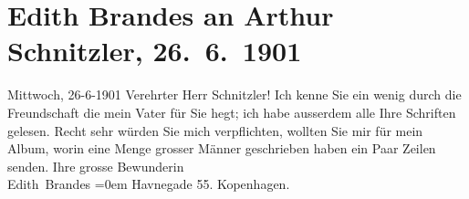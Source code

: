 

         
         \renewcommand{\erwaehntePersonen}{Personen: Georg Brandes}
         \renewcommand{\erwaehnteOrte}{Orte: Havnegade, Kopenhagen, Wien}
         \renewcommand{\erwaehnteWerke}{}
               \section[Edith Brandes an Arthur Schnitzler, 26. 6. 1901]{ Edith Brandes an Arthur Schnitzler, 26. 6. 1901}\nopagebreak{}\rehead{ }\begin{ledgroupsized}[t]{13cm}\normalsize\beginnumbering \toendnotes[C]{\smallbreak\pagebreak[2]} 
\toendnotes[C]{\smallbreak}\pstart
           \raggedleft{}{\pb}Mittwoch, 26-6-1901\pend
           \pstart{}Verehrter Herr Schnitzler!\pend\pstart
           Ich kenne Sie ein wenig durch die Freundschaft die mein Vater für Sie hegt; ich habe
                    ausserdem alle Ihre Schriften gelesen. Recht sehr würden Sie mich verpflichten,
                    wollten Sie mir für mein Album, worin eine Menge grosser Männer geschrieben
                    haben ein Paar Zeilen senden.\pend
           \pstart
           Ihre grosse Bewunderin{\\[\baselineskip]}\spacefill\mbox{Edith Brandes}\pend
           \leftskip=0em{}\pstart
           \noindent{}Havnegade 55. Kopenhagen.\pend
           
         
         \endnumbering{}\end{ledgroupsized}  \newcommand{\dateiname}{L01135}\newcommand{\titel}{Edith Brandes an Arthur Schnitzler, 26. 6. 1901}\newcommand{\editorInnen}{Martin Anton Müller und Gerd-Hermann Susen}
      